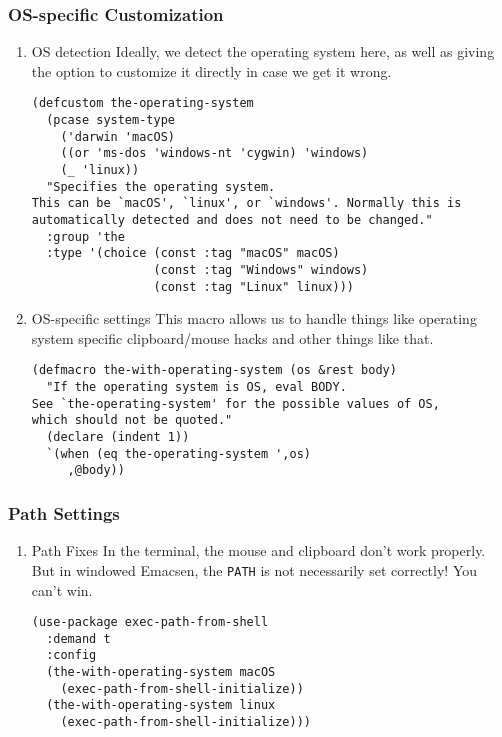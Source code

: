 \documentclass[11pt]{article}
\begin{document}
\subsubsection{OS-specific Customization}
\label{sec:org1069e6c}
\begin{enumerate}
\item OS detection
\label{sec:orga6e8748}
Ideally, we detect the operating system here, as well as giving the
option to customize it directly in case we get it wrong.
\begin{verbatim}
(defcustom the-operating-system
  (pcase system-type
    ('darwin 'macOS)
    ((or 'ms-dos 'windows-nt 'cygwin) 'windows)
    (_ 'linux))
  "Specifies the operating system.
This can be `macOS', `linux', or `windows'. Normally this is
automatically detected and does not need to be changed."
  :group 'the
  :type '(choice (const :tag "macOS" macOS)
                 (const :tag "Windows" windows)
                 (const :tag "Linux" linux)))
\end{verbatim}

\item OS-specific settings
\label{sec:org780714b}
This macro allows us to handle things like operating system specific
clipboard/mouse hacks and other things like that.

\begin{verbatim}
(defmacro the-with-operating-system (os &rest body)
  "If the operating system is OS, eval BODY.
See `the-operating-system' for the possible values of OS,
which should not be quoted."
  (declare (indent 1))
  `(when (eq the-operating-system ',os)
     ,@body))
\end{verbatim}
\end{enumerate}
\subsubsection{Path Settings}
\label{sec:orga8f9a3f}
\begin{enumerate}
\item Path Fixes
\label{sec:org1a63be6}
In the terminal, the mouse and clipboard don't work properly. But in
windowed Emacsen, the \texttt{PATH} is not necessarily set correctly! You
can't win.

\begin{verbatim}
(use-package exec-path-from-shell
  :demand t
  :config
  (the-with-operating-system macOS
    (exec-path-from-shell-initialize))
  (the-with-operating-system linux
    (exec-path-from-shell-initialize)))
\end{verbatim}
\end{enumerate}
\end{document}
